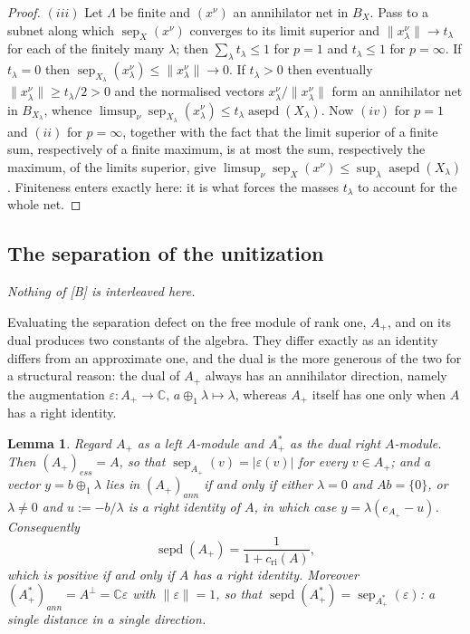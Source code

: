 \documentclass[11pt]{article}
\theoremstyle{plain}
\newtheorem{lemma}[theorem]{Lemma}
\theoremstyle{definition}
\DeclareMathOperator{\sep}{sep}
\DeclareMathOperator{\sepd}{sepd}
\DeclareMathOperator{\asepd}{asepd}
\newcommand{\cri}{c_{\mathrm{ri}}}
\begin{document}
\begin{proof}
$(iii)$ Let $\Lambda$ be finite and ${(x^\nu)}$ an annihilator net in $B_X$. Pass
to a subnet along which $\sep_X(x^\nu)$ converges to its limit superior and
$\lVert x^\nu_\lambda\rVert\to t_\lambda$ for each of the finitely many
$\lambda$; then $\sum_\lambda t_\lambda\leq 1$ for $p=1$ and $t_\lambda\leq 1$
for $p=\infty$. If $t_\lambda=0$ then
$\sep_{X_\lambda}(x^\nu_\lambda)\leq\lVert x^\nu_\lambda\rVert\to0$. If
$t_\lambda>0$ then eventually $\lVert x^\nu_\lambda\rVert\geq t_\lambda/2>0$ and
the normalised vectors $x^\nu_\lambda/\lVert x^\nu_\lambda\rVert$ form an
annihilator net in $B_{X_\lambda}$, whence
$\limsup_\nu\sep_{X_\lambda}(x^\nu_\lambda)\leq t_\lambda\asepd(X_\lambda)$. Now
$(iv)$ for $p=1$ and $(ii)$ for $p=\infty$, together with the fact that the limit
superior of a finite sum, respectively of a finite maximum, is at most the sum,
respectively the maximum, of the limits superior, give
$\limsup_\nu\sep_X(x^\nu)\leq\sup_\lambda\asepd(X_\lambda)$. Finiteness enters
exactly here: it is what forces the masses $t_\lambda$ to account for the whole
net.
\end{proof}

\subsection{The separation of the unitization}\label{SubSectionSeparationOfUnitization}

\emph{Nothing of [B] is interleaved here.}

Evaluating the separation defect on the free module of rank one, $A_+$, and on
its dual produces two constants of the algebra. They differ exactly as an
identity differs from an approximate one, and the dual is the more generous of
the two for a structural reason: the dual of $A_+$ always has an annihilator
direction, namely the augmentation
$\varepsilon:A_+\to\mathbb{C},\,a\oplus_1\lambda\mapsto\lambda$, whereas $A_+$
itself has one only when $A$ has a right identity.

\begin{lemma}\label{AnnihPartOfUnitization}
Regard $A_+$ as a left $A$-module and $A_+^*$ as the dual right $A$-module. Then
${(A_+)}_{ess}=A$, so that $\sep_{A_+}(v)=|\varepsilon(v)|$ for every
$v\in A_+$; and a vector $y=b\oplus_1\lambda$ lies in ${(A_+)}_{ann}$ if and
only if either $\lambda=0$ and $Ab= \{0 \}$, or $\lambda\neq 0$ and
$u:=-b/\lambda$ is a right identity of $A$, in which case
$y=\lambda(e_{A_+}-u)$. Consequently
\[
\sepd(A_+)=\frac{1}{1+\cri(A)} ,
\]
which is positive if and only if $A$ has a right identity. Moreover
${(A_+^*)}_{ann}=A^\perp=\mathbb{C}\varepsilon$ with $\lVert\varepsilon\rVert=1$,
so that $\sepd(A_+^*)=\sep_{A_+^*}(\varepsilon)$: a single distance in a single
direction.
\end{lemma}
\end{document}
